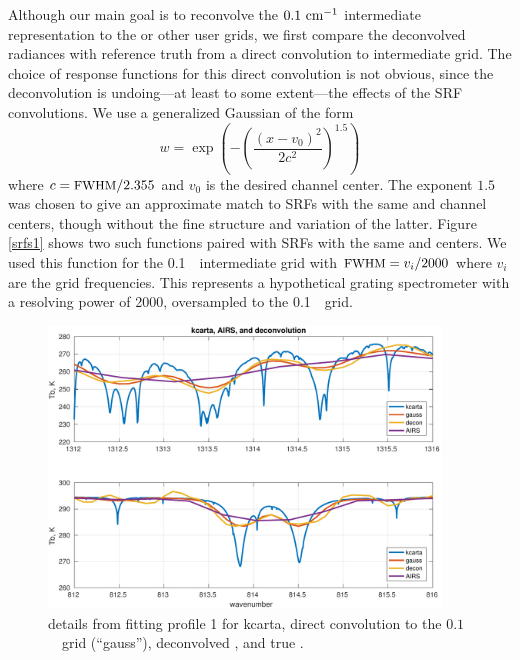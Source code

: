 \documentclass[11pt]{article}
\begin{document}
Although our main goal is to reconvolve the $0.1~\mbox{cm$^{-1}$}$ intermediate
representation to the {\cris} or other user grids, we first compare
the deconvolved radiances with reference truth from a direct
convolution to intermediate grid.  The choice of response functions
for this direct convolution is not obvious, since the deconvolution
is undoing---at least to some extent---the effects of the {\airs}
SRF convolutions.  We use a generalized Gaussian of the form
\[w = \exp\left(-\left(\frac{(x - v_0)^2}{2c^2}\right)^{1.5}\right) \]
where $c=\mbox{\small FWHM} / 2.355$ and $v_0$ is the desired channel center.
The exponent $1.5$ was chosen to give an approximate match to
{\airs} SRFs with the same {\fwhm} and channel centers, though
without the fine structure and variation of the latter.  Figure
\ref{srfs1} shows two such functions paired with {\airs} SRFs with
the same {\fwhm} and centers.  We used this function for the
0.1~\wn\ intermediate grid with ${\mbox{\small FWHM}} = v_i / 2000$ where $v_i$
are the grid frequencies.  This represents a hypothetical grating
spectrometer with a resolving power of 2000, oversampled to the
0.1~\wn\ grid.


\begin{figure} %
  \centering
  \includegraphics[height=7.5cm]{figures/airs_decon_zoom.pdf}
  \caption{details from fitting profile 1 for kcarta, direct
    convolution to the $0.1$~\wn\ grid (``gauss''), deconvolved
    {\airs}, and true {\airs}.}
  \label{dzoom}
\end{figure}
\end{document}
